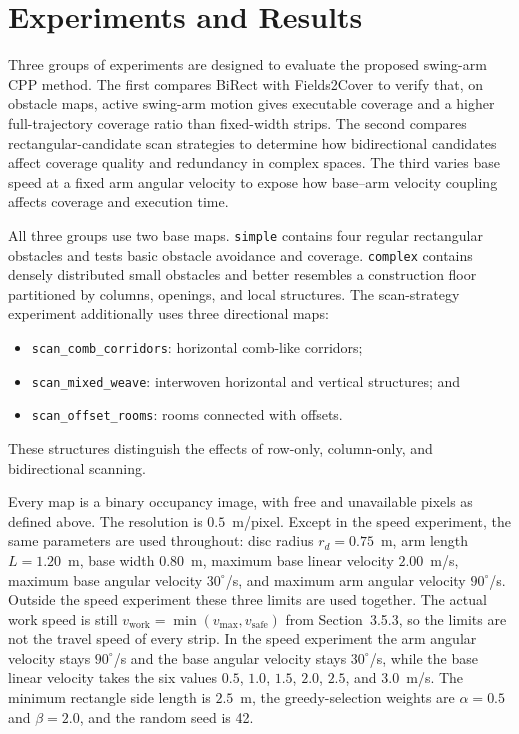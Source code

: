 \section{Experiments and Results}
\label{sec:experiments}

Three groups of experiments are designed to evaluate the proposed swing-arm CPP method. The first compares BiRect with Fields2Cover to verify that, on obstacle maps, active swing-arm motion gives executable coverage and a higher full-trajectory coverage ratio than fixed-width strips. The second compares rectangular-candidate scan strategies to determine how bidirectional candidates affect coverage quality and redundancy in complex spaces. The third varies base speed at a fixed arm angular velocity to expose how base--arm velocity coupling affects coverage and execution time.

All three groups use two base maps. \texttt{simple} contains four regular rectangular obstacles and tests basic obstacle avoidance and coverage. \texttt{complex} contains densely distributed small obstacles and better resembles a construction floor partitioned by columns, openings, and local structures. The scan-strategy experiment additionally uses three directional maps:
\begin{itemize}[nosep]
  \item \texttt{scan\_comb\_corridors}: horizontal comb-like corridors;
  \item \texttt{scan\_mixed\_weave}: interwoven horizontal and vertical structures; and
  \item \texttt{scan\_offset\_rooms}: rooms connected with offsets.
\end{itemize}
These structures distinguish the effects of row-only, column-only, and bidirectional scanning.

Every map is a binary occupancy image, with free and unavailable pixels as defined above. The resolution is $0.5$~m/pixel. Except in the speed experiment, the same parameters are used throughout: disc radius $r_d=0.75$~m, arm length $L=1.20$~m, base width $0.80$~m, maximum base linear velocity $2.00$~m/s, maximum base angular velocity $30^\circ$/s, and maximum arm angular velocity $90^\circ$/s. Outside the speed experiment these three limits are used together. The actual work speed is still $v_{\mathrm{work}}=\min(v_{\max},v_{\mathrm{safe}})$ from Section~3.5.3, so the limits are not the travel speed of every strip. In the speed experiment the arm angular velocity stays $90^\circ$/s and the base angular velocity stays $30^\circ$/s, while the base linear velocity takes the six values $0.5$, $1.0$, $1.5$, $2.0$, $2.5$, and $3.0$~m/s. The minimum rectangle side length is $2.5$~m, the greedy-selection weights are $\alpha=0.5$ and $\beta=2.0$, and the random seed is 42.


